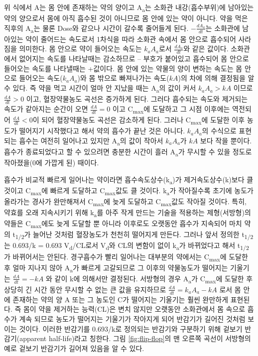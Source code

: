 \documentclass[
  11pt,
  krantz2, a4paper, twoside]{krantz}
\theoremstyle{definition}
\theoremstyle{definition}
\theoremstyle{definition}
\theoremstyle{definition}
\theoremstyle{remark}
\begin{document}
위 식에서 A는 몸 안에 존재하는 약의 양이고 A\textsubscript{a}는 소화관 내강(흡수부위)에 남아있는 약의 양으로서 몸에 아직 흡수된 것이 아니므로 몸 안에 있는 약이 아니다.
약을 먹은 직후의 A\textsubscript{a}는 물론 Dose와 같으나 시간이 갈수록 줄어들게 된다.
\(- \frac{{dA}_{a}}{{dt}}\)는 소화관에 남아있는 약이 줄어드는 속도로서 1차식을 따라 소화관 속에서 몸 안으로 흡수되어 사라짐을 의미한다.
몸 안으로 약이 들어오는 속도는 \(k_{a}A_{a}\)로서 \(\frac{{dA}_{a}}{{dt}}\)와 같은 값이다.
소화관에서 없어지는 속도를 나타날때는 감소하므로 -- 부호가 붙어있고 흡수되어 몸 안으로 들어오는 속도를 나타낼때는 +값이다. 몸 안에 있는
약물의 양이 변하는 속도는 몸 안으로 들어오는 속도(\(k_{a}A_{a}\))와 몸
밖으로 빠져나가는 속도(\({kA}\))의 차에 의해 결정됨을 알 수 있다. 즉
약을 먹고 시간이 얼마 안 지났을 때는 A\textsubscript{a}의 값이 커서 \(k_{a}A_{a} > kA\)
이므로 \(\frac{{dA}}{{dt}} > 0\) 이고, 혈장약물농도 곡선은
증가하게 된다. 그러다 흡수되는 속도와 제거되는 속도가 같아지는 순간이
오면 \(\frac{{dA}}{{dt}} = 0\) 이고 C\textsubscript{max}에 도달하고 그 시점
이후에는 역전되어 \(\frac{{dA}}{{dt}} < 0\)이 되어 혈장약물농도
곡선은 감소하게 된다. 그러나 C\textsubscript{max}에 도달한 이후 농도가 떨어지기
시작했다고 해서 약의 흡수가 끝난 것은 아니다. \(k_{a}A_{a}\)의 수식으로
표현되는 흡수는 여전히 일어나고 있지만 A\textsubscript{a}의 값이 작아서 \(k_{a}A_{a}\)가
\({kA}\) 보다 작을 뿐이다. 흡수가 종료되었다고 할 수 있으려면 충분한
시간이 흘러 A\textsubscript{a}가 무시할 수 있을 정도로 작아졌을(0에 가깝게 된) 때이다.

흡수가 비교적 빠르게 일어나는 약이라면 흡수속도상수(k\textsubscript{a})가
제거속도상수(k)보다 클 것이고 C\textsubscript{max}에 빠르게 도달하고 C\textsubscript{max}값도 클
것이다. k\textsubscript{a}가 작아질수록 초기에 농도가 올라가는 경사가 완만해져서
C\textsubscript{max}에 늦게 도달하고 C\textsubscript{max}값도 작아질 것이다. 특히, 약효를 오래 지속시키기
위해 k\textsubscript{a}를 아주 작게 만드는 기술을 적용하는 제형(서방형)의 약들은
C\textsubscript{max}에도 늦게 도달할 뿐 아니라 이후로도 오랫동안 흡수가 지속되어 마치
약의 t\textsubscript{1/2}가 늘어난 것처럼 혈장농도가 천천히 떨어지게 만든다. 그러나
앞서 정의한 t\textsubscript{1/2}는 0.693/k = 0.693 V\textsubscript{d}/CL로서 V\textsubscript{d}와 CL의 변함이 없이
k\textsubscript{a}가 바뀌었다고 해서 t\textsubscript{1/2}가 바뀌어서는 안된다. 경구흡수가 빨리
일어나는 대부분의 약에서는 C\textsubscript{max}에 도달한 후 얼마 지나지 않아 A\textsubscript{a}가
빠르게 고갈되므로 그 이후의 약물농도가 떨어지는 기울기는
\(\frac{{dA}}{{dt}} = - kA\) 와 같이 k에 의해서만 결정된다.
서방형의 경우 A\textsubscript{a}가 C\textsubscript{max}에 도달한 후 상당히 긴 시간 동안 무시할 수 없는 큰 값을 유지하므로 \(\frac{{dA}}{{dt}} = k_{a}A_{a} - kA\) 로서 몸 안에 존재하는
약의 양 A 또는 그 농도인 C가 떨어지는 기울기는 훨씬 완만하게 표현된다.
즉 몸이 약을 제거하는 능력(CL)은 변치 않지만 오랫동안 소화관에서 몸 속으로
흡수가 계속 되므로 농도가 떨어지는 기울기가 작아지게 되어 반감기가
길어진 것처럼 보이는 것이다. 이러한 반감기를 0.693/k로 정의되는 반감기와
구분하기 위해 겉보기 반감기(apparent half-life)라고 칭한다. 그림 \ref{fig:flip-flop}의
맨 오른쪽 곡선이 서방형의 예로 겉보기 반감기가 길어져 있음을 알 수 있다.
\end{document}
